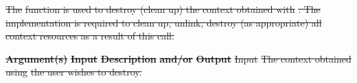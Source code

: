 \documentclass[12pt]{report} %
\providecommand{\DIFdeltex}[1]{{\protect\color{red}\sout{#1}}}                      %
\providecommand{\DIFdelbegin}{} %
\providecommand{\DIFdelend}{} %
\providecommand{\DIFdel}[1]{\texorpdfstring{\DIFdeltex{#1}}{}} %
\newcommand{\DIFscaledelfig}{0.5}
\newlength{\DIFdelgraphicswidth} %
\newlength{\DIFdelgraphicsheight} %
\newcommand{\DIFdelincludegraphics}[2][]{%
\sbox{\DIFdelgraphicsbox}{\DIFOincludegraphics[#1]{#2}}%
\settoboxwidth{\DIFdelgraphicswidth}{\DIFdelgraphicsbox} %
\settoboxtotalheight{\DIFdelgraphicsheight}{\DIFdelgraphicsbox} %
\scalebox{\DIFscaledelfig}{%
\parbox[b]{\DIFdelgraphicswidth}{\usebox{\DIFdelgraphicsbox}\\[-\baselineskip] \rule{\DIFdelgraphicswidth}{0em}}\llap{\resizebox{\DIFdelgraphicswidth}{\DIFdelgraphicsheight}{%
\setlength{\unitlength}{\DIFdelgraphicswidth}%
\begin{picture}(1,1)%
\thicklines\linethickness{2pt} %
{\color[rgb]{1,0,0}\put(0,0){\framebox(1,1){}}}%
{\color[rgb]{1,0,0}\put(0,0){\line( 1,1){1}}}%
{\color[rgb]{1,0,0}\put(0,1){\line(1,-1){1}}}%
\end{picture}%
}\hspace*{3pt}}} %
} %
\DeclareRobustCommand{\DIFdelbegin}{\DIFOdelbegin \let\includegraphics\DIFdelincludegraphics} %
\DeclareRobustCommand{\DIFdelend}{\DIFOaddend \let\includegraphics\DIFOincludegraphics} %
\begin{document}
\DIFdelbegin %

\DIFdelend %
\DIFdelbegin %

\DIFdel{The }%
\DIFdel{function is used to destroy (clean up) the context obtained with }%
\DIFdel{.
The implementation is required to clean up, unlink, destroy (as appropriate) all context resources as a result of this call.
}%


\textbf{\DIFdel{Argument(s)}} %
\textbf{\DIFdel{Input }}  %
\textbf{\DIFdel{Description}} %
\textbf{\DIFdel{and/or}}     %
\textbf{\DIFdel{Output}} %
\DIFdel{Input  }%
\DIFdel{The context obtained using }%
\DIFdel{the user wishes to destroy.  }%
\end{document}
